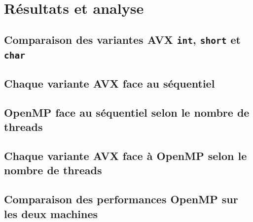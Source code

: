 \section{Résultats et analyse}
\subsection{Comparaison des variantes AVX \texttt{int}, \texttt{short} et \texttt{char}}
\subsection{Chaque variante AVX face au séquentiel}
\subsection{OpenMP face au séquentiel selon le nombre de threads}
\subsection{Chaque variante AVX face à OpenMP selon le nombre de threads}
\subsection{Comparaison des performances OpenMP sur les deux machines}
